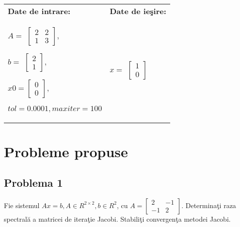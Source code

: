 \documentclass{exam}
\theoremstyle{definition}
\begin{document}
\begin{center}
	\begin{tabular}{| l | l |}
		\hline
		\textbf{Date de intrare:}  & \textbf{Date de ieşire:} \\
		$A = $
		$\left[ {\begin{array}{cc}
							         2 & 2 \\
							         1 & 3
						         \end{array} } \right],$

		$b = $
		$\left[ {\begin{array}{cc}
							         2 \\
							         1
						         \end{array} } \right],$

		$x0 =
			\left[ {\begin{array}{cc}
							        0 \\
							        0
						        \end{array} } \right],$

		$ tol=0.0001, maxiter=100$ &
		$x = $
		$\left[ {\begin{array}{cc}
							         1 \\
							         0
						         \end{array} } \right]$
		\\
		\hline
	\end{tabular}
\end{center}

\section{Probleme propuse}

\subsection{Problema 1}
Fie sistemul $Ax=b, A \in R^{2 \times 2}, b \in R^{2}$, cu
$A =\left[ {\begin{array}{cc}
					2  & -1 \\
					-1 & 2
				\end{array} } \right]$. Determina\c{t}i raza spectral\u{a} a matricei de itera\c{t}ie Jacobi. Stabili\c{t}i convergen\c{t}a metodei Jacobi.
\end{document}
